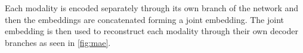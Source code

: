 Each modality is encoded separately through its own branch of the network and then the embeddings are concatenated forming a joint embedding. The joint embedding is then used to reconstruct each modality through their own decoder branches as seen in \autoref{fig:mae}.

%
%
%

\theendnotes